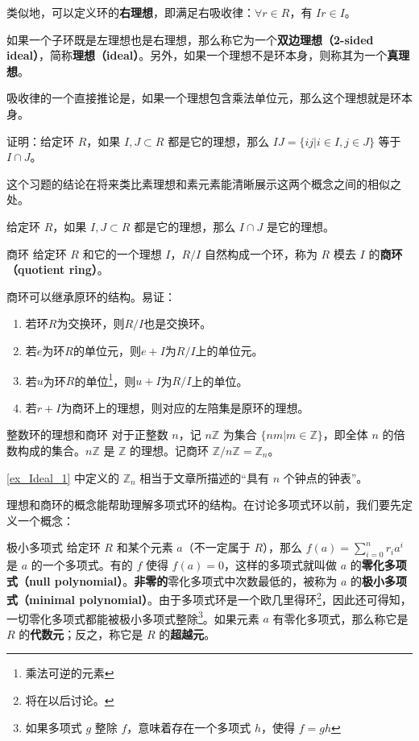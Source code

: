 类似地，可以定义环的\textbf{右理想}，即满足右吸收律：$\forall r\in R$，有 $Ir\in I$。

如果一个子环既是左理想也是右理想，那么称它为一个\textbf{双边理想（2-sided ideal）}，简称\textbf{理想（ideal）}。另外，如果一个理想不是环本身，则称其为一个\textbf{真理想}。

吸收律的一个直接推论是，如果一个理想包含乘法单位元，那么这个理想就是环本身。

\begin{exercise}{}
证明：给定环 $R$，如果 $I, J\subset R$ 都是它的理想，那么 $IJ=\{ij|i\in I, j\in J\}$ 等于 $I\cap J$。
\end{exercise}

这个习题的结论在将来类比素理想和素元素能清晰展示这两个概念之间的相似之处。

\begin{theorem}{}
给定环 $R$，如果 $I, J\subset R$ 都是它的理想，那么 $I\cap J$ 是它的理想。
\end{theorem}


\begin{definition}{商环}
给定环 $R$ 和它的一个理想 $I$，$R/I$ 自然构成一个环，称为 $R$ 模去 $I$ 的\textbf{商环（quotient ring）}。
\end{definition}
商环可以继承原环的结构。易证：
\begin{enumerate}
\item 若环$R$为交换环，则$R/I$也是交换环。
\item 若$e$为环$R$的单位元，则$e+I$为$R/I$上的单位元。
\item 若$u$为环$R$的单位\footnote{乘法可逆的元素}，则$u+I$为$R/I$上的单位。
\item 若$r+I$为商环上的理想，则对应的左陪集是原环的理想。
\end{enumerate}


\begin{example}{整数环的理想和商环}\label{ex_Ideal_1}
对于正整数 $n$，记 $n\mathbb{Z}$ 为集合 $\{nm|m\in\mathbb{Z}\}$，即全体 $n$ 的倍数构成的集合。$n\mathbb{Z}$ 是 $\mathbb{Z}$ 的理想。记商环 $\mathbb{Z}/n\mathbb{Z}=\mathbb{Z}_n$。
\end{example}

\autoref{ex_Ideal_1} 中定义的 $\mathbb{Z}_n$ 相当于文章所描述的“具有 $n$ 个钟点的钟表”。


理想和商环的概念能帮助理解多项式环的结构。在讨论多项式环以前，我们要先定义一个概念：

\begin{definition}{极小多项式}
给定环 $R$ 和某个元素 $a$（不一定属于 $R$），那么 $f(a)=\sum\limits^{n}_{i=0}r_ia^i$ 是 $a$ 的一个多项式。有的 $f$ 使得 $f(a)=0$，这样的多项式就叫做 $a$ 的\textbf{零化多项式（null polynomial）}。\textbf{非零的}零化多项式中次数最低的，被称为 $a$ 的\textbf{极小多项式（minimal polynomial）}。由于多项式环是一个欧几里得环\footnote{将在以后讨论。}，因此还可得知，一切零化多项式都能被极小多项式整除\footnote{如果多项式 $g$ 整除 $f$，意味着存在一个多项式 $h$，使得 $f=gh$}。如果元素 $a$ 有零化多项式，那么称它是 $R$ 的\textbf{代数元}；反之，称它是 $R$ 的\textbf{超越元}。
\end{definition}

